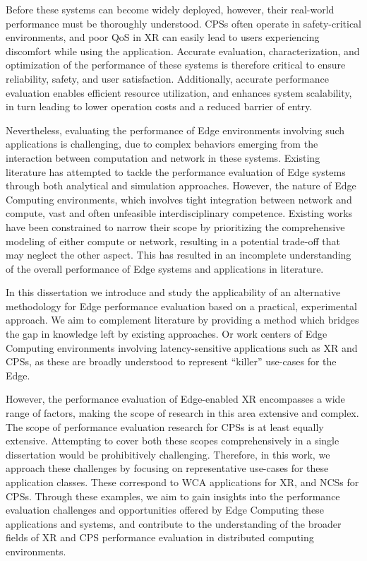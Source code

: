 Before these systems can become widely deployed, however, their real-world performance must be thoroughly understood.
\glspl{CPS} often operate in safety-critical environments, and poor \gls{QoS} in \gls{XR} can easily lead to users experiencing discomfort while using the application.
Accurate evaluation, characterization, and optimization of the performance of these systems is therefore critical to ensure reliability, safety, and user satisfaction.
Additionally, accurate performance evaluation enables efficient resource utilization, and enhances system scalability, in turn leading to lower operation costs and a reduced barrier of entry.

Nevertheless, evaluating the performance of Edge environments involving such applications is challenging, due to complex behaviors emerging from the interaction between computation and network in these systems.
Existing literature has attempted to tackle the performance evaluation of Edge systems through both analytical and simulation approaches.
However, the nature of Edge Computing environments, which involves tight integration between network and compute, vast and often unfeasible interdisciplinary competence.
Existing works have been constrained to narrow their scope by prioritizing the comprehensive modeling of either compute or network, resulting in a potential trade-off that may neglect the other aspect.
This has resulted in an incomplete understanding of the overall performance of Edge systems and applications in literature.

In this dissertation we introduce and study the applicability of an alternative methodology for Edge performance evaluation based on a practical, experimental approach.
We aim to complement literature by providing a method which bridges the gap in knowledge left by existing approaches.
Or work centers of Edge Computing environments involving latency-sensitive applications such as \gls{XR} and \glspl{CPS}, as these are broadly understood to represent ``killer'' use-cases for the Edge.

However, the performance evaluation of Edge-enabled \gls{XR} encompasses a wide range of factors, making the scope of research in this area extensive and complex.
The scope of performance evaluation research for \glspl{CPS} is at least equally extensive.
Attempting to cover both these scopes comprehensively in a single dissertation would be prohibitively challenging.
Therefore, in this work, we approach these challenges by focusing on representative use-cases for these application classes.
These correspond to \gls{WCA} applications for \gls{XR}, and \glspl{NCS} for \glspl{CPS}.
Through these examples, we aim to gain insights into the performance evaluation challenges and opportunities offered by Edge Computing these applications and systems, and contribute to the understanding of the broader fields of \gls{XR} and \gls{CPS} performance evaluation in distributed computing environments.
